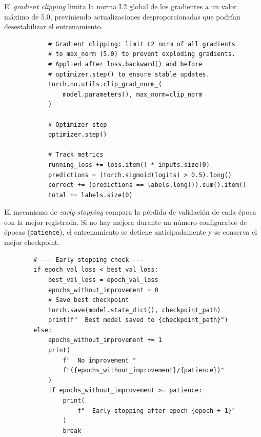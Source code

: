 El \textit{gradient clipping} limita la norma L2 global de los gradientes a un valor máximo de 5.0, previniendo actualizaciones desproporcionadas que podrían desestabilizar el entrenamiento.

\begin{verbatim}
            # Gradient clipping: limit L2 norm of all gradients
            # to max_norm (5.0) to prevent exploding gradients.
            # Applied after loss.backward() and before
            # optimizer.step() to ensure stable updates.
            torch.nn.utils.clip_grad_norm_(
                model.parameters(), max_norm=clip_norm
            )

            # Optimizer step
            optimizer.step()

            # Track metrics
            running_loss += loss.item() * inputs.size(0)
            predictions = (torch.sigmoid(logits) > 0.5).long()
            correct += (predictions == labels.long()).sum().item()
            total += labels.size(0)
\end{verbatim}

El mecanismo de \textit{early stopping} compara la pérdida de validación de cada época con la mejor registrada. Si no hay mejora durante un número configurable de épocas (\texttt{patience}), el entrenamiento se detiene anticipadamente y se conserva el mejor checkpoint.

\begin{verbatim}
        # --- Early stopping check ---
        if epoch_val_loss < best_val_loss:
            best_val_loss = epoch_val_loss
            epochs_without_improvement = 0
            # Save best checkpoint
            torch.save(model.state_dict(), checkpoint_path)
            print(f"  Best model saved to {checkpoint_path}")
        else:
            epochs_without_improvement += 1
            print(
                f"  No improvement "
                f"({epochs_without_improvement}/{patience})"
            )
            if epochs_without_improvement >= patience:
                print(
                    f"  Early stopping after epoch {epoch + 1}"
                )
                break
\end{verbatim}


